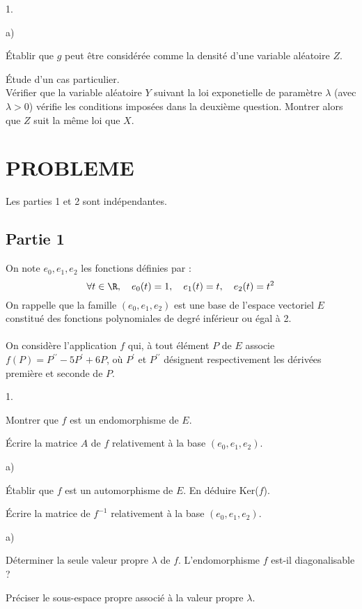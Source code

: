 \documentclass[11pt]{article}%
\begin{document}
\begin{noliste}{1.}
\begin{noliste}{a)}
\item Établir que $g$ peut être considérée comme la densité
d'une variable aléatoire $Z$.

\item Étude d'un cas particulier.\\
Vérifier que la variable aléatoire $Y$ suivant la loi exponetielle
de paramètre $\lambda $ (avec $\lambda >0$) vérifie les conditions
imposées dans la deuxième question. Montrer alors que $Z$ suit la même
loi que $X$.\\
\end{noliste}
\end{noliste}

\section*{PROBLEME}

Les parties 1 et 2 sont indépendantes.

\subsection*{Partie 1}

On note $e_{0},e_{1},e_{2}$ les fonctions définies par : 
\[
\forall t\in \R,\quad e_{0}(t) = 1,\quad e_{1}(t) = t,\quad
e_{2}(t) = t^{2}
\]
On rappelle que la famille $(e_{0},e_{1},e_{2})$ est une base de
l'espace
vectoriel $E$ constitué des fonctions polynomiales de degré inférieur
ou égal à 2.\\
\\
On considère l'application $f$ qui, à tout élément $P$ de $E$
associe $f(P) = P^{\prime \prime }-5P^{\prime } + 6P$, où $P^{\prime }$
et $P^{\prime \prime }$ désignent respectivement les dérivées première
et seconde de $P$.

\begin{noliste}{1.}
 \setlength{\itemsep}{4mm}
\item Montrer que $f$ est un endomorphisme de $E$.

\item Écrire la matrice $A$ de $f$ relativement à la base $(e_{0},
e_{1},
e_{2})$.

\item 
\begin{noliste}{a)}
 \setlength{\itemsep}{2mm}
\item Établir que $f$ est un automorphisme de $E$. En déduire Ker($f$).

\item Écrire la matrice de $f^{-1}$ relativement à la base $(e_{0},
e_{1},
e_{2})$.
\end{noliste}

\item 
\begin{noliste}{a)}
 \setlength{\itemsep}{2mm}
\item Déterminer la seule valeur propre $\lambda$ de $f$.
L'endomorphisme $f$ est-il diagonalisable ?

\item Préciser le sous-espace propre associé à la valeur propre
$\lambda $.
\end{noliste}
\end{noliste}
\end{document}
